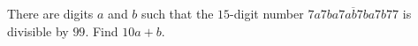 There are digits $a$ and $b$ such that the $15$-digit number $\overline{7a7ba7ab7ba7b77}$ is divisible by $99$. Find $10a+b$.
